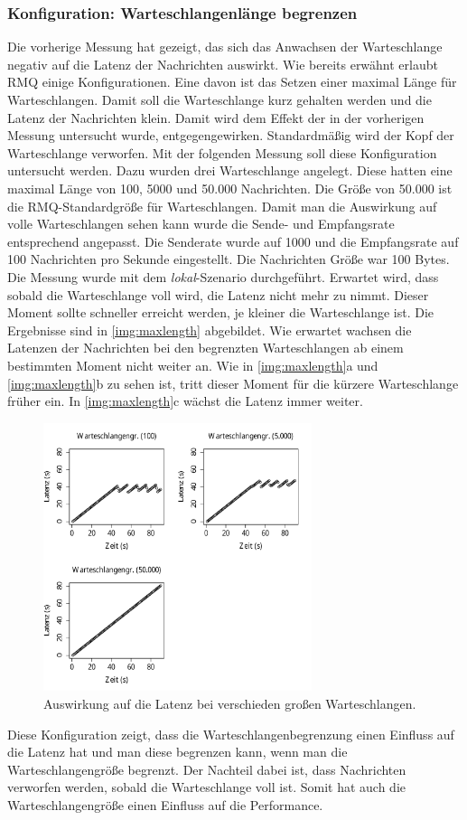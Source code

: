 \subsubsection{Konfiguration: Warteschlangenlänge begrenzen}
\label{sec:maxlength}
Die vorherige Messung hat gezeigt, das sich das Anwachsen der Warteschlange negativ auf die Latenz der Nachrichten auswirkt. Wie bereits erwähnt erlaubt RMQ einige Konfigurationen. Eine davon ist das Setzen einer maximal Länge für Warteschlangen. Damit soll die Warteschlange kurz gehalten werden und die Latenz der Nachrichten klein. Damit wird dem Effekt der in der vorherigen Messung untersucht wurde, entgegengewirken. Standardmäßig wird der Kopf der Warteschlange verworfen. Mit der folgenden Messung soll diese Konfiguration untersucht werden. Dazu wurden drei Warteschlange angelegt. Diese hatten eine maximal Länge von 100, 5000 und 50.000 Nachrichten. Die Größe von 50.000 ist die RMQ-Standardgröße für Warteschlangen. Damit man die Auswirkung auf volle Warteschlangen sehen kann wurde die Sende- und Empfangsrate entsprechend angepasst. Die Senderate wurde auf 1000 und die Empfangsrate auf 100 Nachrichten pro Sekunde eingestellt. Die Nachrichten Größe war 100 Bytes. Die Messung wurde mit dem \textit{lokal}-Szenario durchgeführt. Erwartet wird, dass sobald die Warteschlange voll wird, die Latenz nicht mehr zu nimmt. Dieser Moment sollte schneller erreicht werden, je kleiner die Warteschlange ist.
Die Ergebnisse sind in \autoref{img:maxlength} abgebildet. Wie erwartet wachsen die Latenzen der Nachrichten bei den begrenzten Warteschlangen ab einem bestimmten Moment nicht weiter an. Wie in \autoref{img:maxlength}a und \autoref{img:maxlength}b zu sehen ist, tritt dieser Moment für die kürzere Warteschlange früher ein. In \autoref{img:maxlength}c wächst die Latenz immer weiter.
\begin{figure}
\center
  \includegraphics[width=0.7\textwidth]{images/measurement/max-length.pdf}
  \caption{Auswirkung auf die Latenz bei verschieden großen Warteschlangen.}
  \label{img:maxlength}
\end{figure}
Diese Konfiguration zeigt, dass die Warteschlangenbegrenzung einen Einfluss auf die Latenz hat und man diese begrenzen kann, wenn man die Warteschlangengröße begrenzt. Der Nachteil dabei ist, dass Nachrichten verworfen werden, sobald die Warteschlange voll ist. Somit hat auch die Warteschlangengröße einen Einfluss auf die Performance. 

